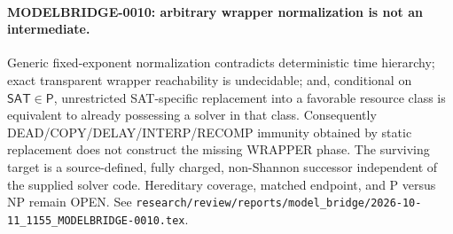 \paragraph{MODELBRIDGE-0010: arbitrary wrapper normalization is not an intermediate.}
Generic fixed-exponent normalization contradicts deterministic time hierarchy;
exact transparent wrapper reachability is undecidable; and, conditional on
$\mathsf{SAT}\in\mathsf P$, unrestricted SAT-specific replacement into a
favorable resource class is equivalent to already possessing a solver in that
class.  Consequently DEAD/COPY/DELAY/INTERP/RECOMP immunity obtained by static
replacement does not construct the missing WRAPPER phase.  The surviving
target is a source-defined, fully charged, non-Shannon successor independent
of the supplied solver code.  Hereditary coverage, matched endpoint, and P
versus NP remain OPEN.  See
\texttt{research/review/reports/model\_bridge/2026-10-11\_1155\_MODELBRIDGE-0010.tex}.
